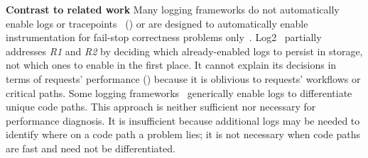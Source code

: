 \noindent\textbf{Contrast to related work} Many logging frameworks do not
automatically enable logs or tracepoints~\cite{Erlingsson:2011wy,
Mace:2015uh} () or are designed to automatically enable
instrumentation for fail-stop correctness problems
only~\cite{ArumugaNainar:2010fx, Yuan:2012eh, Yuan:2010ww, Zuo:2016et,
Zhao:2017co}.  Log2~\cite{Ding:2015td} partially addresses \textit{R1}
and \textit{R2} by deciding which already-enabled logs to persist in
storage, not which ones to enable in the first place.  It cannot
explain its decisions in terms of requests' performance ()
because it is oblivious to requests' workflows or critical paths.
Some logging frameworks~\cite{Zhao:2017co} generically enable logs to
differentiate unique code paths.  This approach is neither sufficient
nor necessary for performance diagnosis.  It is insufficient because
additional logs may be needed to identify where on a code path a
problem lies; it is not necessary when code paths are fast and need
not be differentiated.

